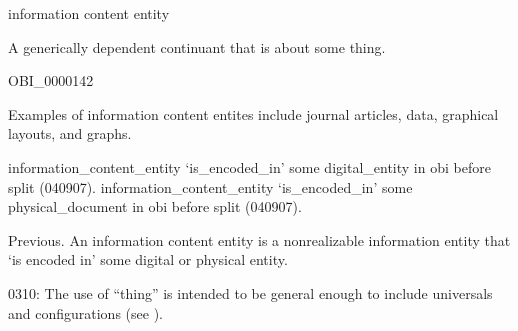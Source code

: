 \documentclass[letterpaper,10pt,english]{sphinxmanual}
\begin{document}
\begin{sphinxShadowBox}

\sphinxAtStartPar
information content entity
\end{sphinxShadowBox}

\begin{sphinxShadowBox}

\sphinxAtStartPar
{\hyperref[\detokenize{doc-BFO_0000031::doc}]{}}
\end{sphinxShadowBox}

\begin{sphinxShadowBox}

\sphinxAtStartPar
A generically dependent continuant that is about some thing.
\end{sphinxShadowBox}

\begin{sphinxShadowBox}

\sphinxAtStartPar
OBI\_0000142
\end{sphinxShadowBox}

\begin{sphinxShadowBox}

\sphinxAtStartPar
Examples of information content entites include journal articles, data, graphical layouts, and graphs.
\end{sphinxShadowBox}

\begin{sphinxShadowBox}

\sphinxAtStartPar
information\_content\_entity ‘is\_encoded\_in’ some digital\_entity in obi before split (040907). information\_content\_entity ‘is\_encoded\_in’ some physical\_document in obi before split (040907).

\sphinxAtStartPar
Previous. An information content entity is a non\sphinxhyphen{}realizable information entity that ‘is encoded in’ some digital or physical entity.

\sphinxhyphen{}03\sphinxhyphen{}10: The use of “thing” is intended to be general enough to include universals and configurations (see ).
\end{sphinxShadowBox}
\end{document}
